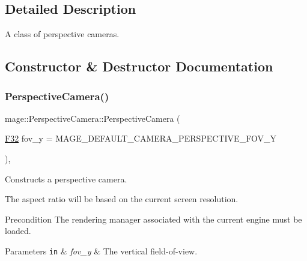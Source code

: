 \subsection{Detailed Description}
A class of perspective cameras. 

\subsection{Constructor \& Destructor Documentation}
\hypertarget{classmage_1_1_perspective_camera_a64b7794febfaaf250117279095c709a2}{}\label{classmage_1_1_perspective_camera_a64b7794febfaaf250117279095c709a2} 
\subsubsection{\texorpdfstring{Perspective\+Camera()}{PerspectiveCamera()}\hspace{0.1cm}{\footnotesize\ttfamily [1/6]}}
{\footnotesize\ttfamily mage\+::\+Perspective\+Camera\+::\+Perspective\+Camera (\begin{DoxyParamCaption}\item[{\hyperlink{namespacemage_aa97e833b45f06d60a0a9c4fc22ae02c0}{F32}}]{fov\+\_\+y = {\ttfamily MAGE\+\_\+DEFAULT\+\_\+CAMERA\+\_\+PERSPECTIVE\+\_\+FOV\+\_\+Y} }\end{DoxyParamCaption})\hspace{0.3cm}{\ttfamily [explicit]}, {\ttfamily [noexcept]}}

Constructs a perspective camera.

The aspect ratio will be based on the current screen resolution.

\begin{DoxyPrecond}{Precondition}
The rendering manager associated with the current engine must be loaded. 
\end{DoxyPrecond}

\begin{DoxyParams}[1]{Parameters}
\mbox{\tt in}  & {\em fov\+\_\+y} & The vertical field-\/of-\/view. \\
\hline
\end{DoxyParams}
\hypertarget{classmage_1_1_perspective_camera_a2be0521c2d0da56c10442928be5fc1c3}{}\label{classmage_1_1_perspective_camera_a2be0521c2d0da56c10442928be5fc1c3} 
